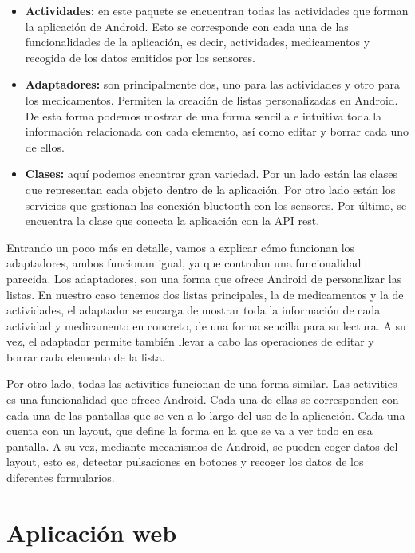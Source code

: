 \documentclass[11pt,spanish]{article}
\begin{document}
\begin{itemize}
	\item {\bf Actividades: } en este paquete se encuentran todas las actividades que forman la aplicación de Android. Esto se corresponde con cada una de las funcionalidades de la aplicación, es decir, actividades, medicamentos y recogida de los datos emitidos por los sensores.
    \item {\bf Adaptadores: } son principalmente dos, uno para las actividades y otro para los medicamentos. Permiten la creación de listas personalizadas en Android. De esta forma podemos mostrar de una forma sencilla e intuitiva toda la información relacionada con cada elemento, así como editar y borrar cada uno de ellos.
    \item {\bf Clases: } aquí podemos encontrar gran variedad. Por un lado están las clases que representan cada objeto dentro de la aplicación. Por otro lado están los servicios que gestionan las conexión bluetooth con los sensores. Por último, se encuentra la clase que conecta la aplicación con la API rest.
\newline
\end{itemize}

Entrando un poco más en detalle, vamos a explicar cómo funcionan los adaptadores, ambos funcionan igual, ya que controlan una funcionalidad parecida. Los adaptadores, son una forma que ofrece Android de personalizar las listas. En nuestro caso tenemos dos listas principales, la de medicamentos y la de actividades, el adaptador se encarga de mostrar toda la información de cada actividad y medicamento en concreto, de una forma sencilla para su lectura. A su vez, el adaptador permite también llevar a cabo las operaciones de editar y borrar cada elemento de la lista.
\newline

Por otro lado, todas las activities funcionan de una forma similar. Las activities es una funcionalidad que ofrece Android. Cada una de ellas se corresponden con cada una de las pantallas que se ven a lo largo del uso de la aplicación. Cada una cuenta con un layout, que define la forma en la que se va a ver todo en esa pantalla. A su vez, mediante mecanismos de Android, se pueden coger datos del layout, esto es, detectar pulsaciones en botones y recoger los datos de los diferentes formularios.
\newpage

\newpage
\section{Aplicación web}
\end{document}
